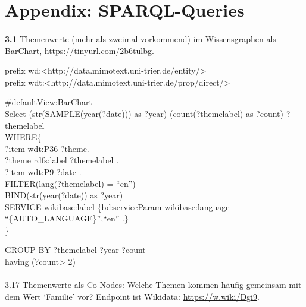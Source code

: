\documentclass[
  12pt,
  letterpaper,
  DIV=11,
  numbers=noendperiod]{scrreprt}
\makeatletter
\let\oldparagraph\paragraph
\renewcommand{\paragraph}{
    \@ifstar
      \xxxParagraphStar
      \xxxParagraphNoStar
  }
\newcommand{\xxxParagraphStar}[1]{\oldparagraph*{#1}\mbox{}}
\newcommand{\xxxParagraphNoStar}[1]{\oldparagraph{#1}\mbox{}}
\makeatother
\begin{document}
\section{Appendix: SPARQL-Queries}\label{appendix-sparql-queries}

\paragraph{\texorpdfstring{\textbf{3.1} Themenwerte (mehr als zweimal
vorkommend) im Wissensgraphen als BarChart,
\url{https://tinyurl.com/2b6tulbg}.}{3.1 Themenwerte (mehr als zweimal vorkommend) im Wissensgraphen als BarChart, https://tinyurl.com/2b6tulbg.}}\label{themenwerte-mehr-als-zweimal-vorkommend-im-wissensgraphen-als-barchart-httpstinyurl.com2b6tulbg.}

prefix
wd:\textless http://data.mimotext.uni-trier.de/entity/\textgreater{}\\
prefix
wdt:\textless http://data.mimotext.uni-trier.de/prop/direct/\textgreater{}

\#defaultView:BarChart\\
Select (str(SAMPLE(year(?date))) as ?year) (count(?themelabel) as
?count) ?themelabel\\
WHERE\{\\
?item wdt:P36 ?theme.\\
?theme rdfs:label ?themelabel .\\
?item wdt:P9 ?date .\\
FILTER(lang(?themelabel) = ``en'')\\
BIND(str(year(?date)) as ?year)\\
SERVICE wikibase:label \{bd:serviceParam wikibase:language
``\{AUTO\_LANGUAGE\}'',``en'' .\}\\
\}

GROUP BY ?themelabel ?year ?count\\
having (?count\textgreater{} 2)

\paragraph{\texorpdfstring{3.17 Themenwerte als Co-Nodes: Welche Themen
kommen häufig gemeinsam mit dem Wert `Familie' vor? Endpoint ist
Wikidata:
\url{https://w.wiki/Dgi9}.}{3.17 Themenwerte als Co-Nodes: Welche Themen kommen häufig gemeinsam mit dem Wert `Familie' vor? Endpoint ist Wikidata: https://w.wiki/Dgi9.}}\label{themenwerte-als-co-nodes-welche-themen-kommen-huxe4ufig-gemeinsam-mit-dem-wert-familie-vor-endpoint-ist-wikidata-httpsw.wikidgi9.}
\end{document}
